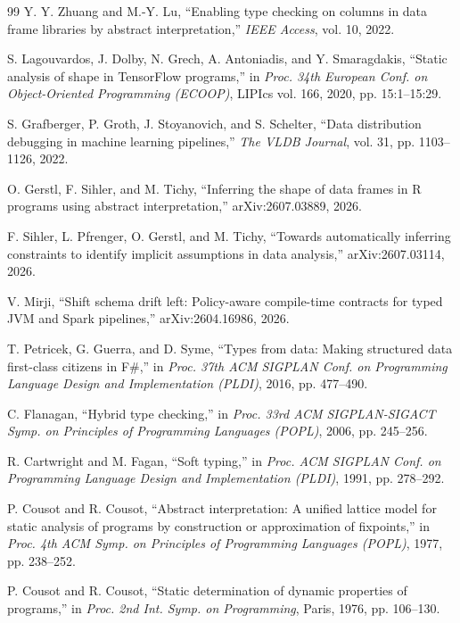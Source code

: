\begin{thebibliography}{99}
Y. Y. Zhuang and M.-Y. Lu, ``Enabling type checking on columns in data frame libraries by abstract
interpretation,'' \emph{IEEE Access}, vol. 10, 2022.

S. Lagouvardos, J. Dolby, N. Grech, A. Antoniadis, and Y. Smaragdakis, ``Static analysis of shape in
TensorFlow programs,'' in \emph{Proc. 34th European Conf. on Object-Oriented Programming (ECOOP)},
LIPIcs vol. 166, 2020, pp. 15:1--15:29.

S. Grafberger, P. Groth, J. Stoyanovich, and S. Schelter, ``Data distribution debugging in machine
learning pipelines,'' \emph{The VLDB Journal}, vol. 31, pp. 1103--1126, 2022.

O. Gerstl, F. Sihler, and M. Tichy, ``Inferring the shape of data frames in R programs using
abstract interpretation,'' arXiv:2607.03889, 2026.

F. Sihler, L. Pfrenger, O. Gerstl, and M. Tichy, ``Towards automatically inferring constraints to
identify implicit assumptions in data analysis,'' arXiv:2607.03114, 2026.

V. Mirji, ``Shift schema drift left: Policy-aware compile-time contracts for typed JVM and Spark
pipelines,'' arXiv:2604.16986, 2026.

T. Petricek, G. Guerra, and D. Syme, ``Types from data: Making structured data first-class citizens
in F\#,'' in \emph{Proc. 37th ACM SIGPLAN Conf. on Programming Language Design and Implementation
(PLDI)}, 2016, pp. 477--490.

C. Flanagan, ``Hybrid type checking,'' in \emph{Proc. 33rd ACM SIGPLAN-SIGACT Symp. on Principles
of Programming Languages (POPL)}, 2006, pp. 245--256.

R. Cartwright and M. Fagan, ``Soft typing,'' in \emph{Proc. ACM SIGPLAN Conf. on Programming
Language Design and Implementation (PLDI)}, 1991, pp. 278--292.

P. Cousot and R. Cousot, ``Abstract interpretation: A unified lattice model for static analysis of
programs by construction or approximation of fixpoints,'' in \emph{Proc. 4th ACM Symp. on
Principles of Programming Languages (POPL)}, 1977, pp. 238--252.

P. Cousot and R. Cousot, ``Static determination of dynamic properties of programs,'' in \emph{Proc.
2nd Int. Symp. on Programming}, Paris, 1976, pp. 106--130.


\end{thebibliography}

